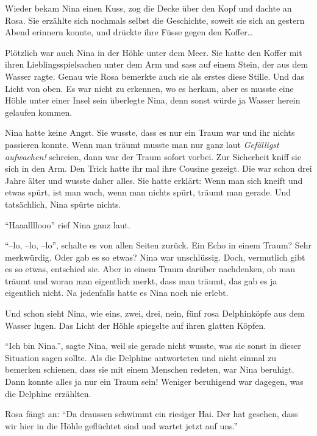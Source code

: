 Wieder bekam Nina einen Kuss, zog die Decke über den Kopf und dachte an Rosa. Sie erzählte sich nochmals selbst die Geschichte, soweit sie sich an gestern Abend erinnern konnte, und drückte ihre Füsse gegen den Koffer\dots

\vspace{10pt}
\centerline{\Huge \Dolphin[DeepPink]}
\vspace{10pt}

Plötzlich war auch Nina in der Höhle unter dem Meer. Sie hatte den Koffer mit ihren Lieblingsspielsachen unter dem Arm und sass auf einem Stein, der aus dem Wasser ragte. Genau wie Rosa bemerkte auch sie als erstes diese Stille. Und das Licht von oben. Es war nicht zu erkennen, wo es herkam, aber es musste eine Höhle unter einer Insel sein überlegte Nina, denn sonst würde ja Wasser herein gelaufen kommen.

Nina hatte keine Angst. Sie wusste, dass es nur ein Traum war und ihr nichts passieren konnte. Wenn man träumt musste man nur ganz laut {\itshape Gefälligst aufwachen!} schreien, dann war der Traum sofort vorbei. Zur Sicherheit kniff sie sich in den Arm. Den Trick hatte ihr mal ihre Cousine gezeigt. Die war schon drei Jahre älter und wusste daher alles. Sie hatte erklärt: Wenn man sich kneift und etwas spürt, ist man wach, wenn man nichts spürt, träumt man gerade. Und tatsächlich, Nina spürte nichts.

\enquote{Haaallllooo} rief Nina ganz laut.

\enquote{--lo, --lo, --lo}, schalte es von allen Seiten zurück. Ein Echo in einem Traum? Sehr merkwürdig. Oder gab es so etwas? Nina war unschlüssig. Doch, vermutlich gibt es so etwas, entschied sie. Aber in einem Traum darüber nachdenken, ob man träumt und woran man eigentlich merkt, dass man träumt, das gab es ja eigentlich nicht. Na jedenfalls hatte es Nina noch nie erlebt.

Und schon sieht Nina, wie eins, zwei, drei, nein, fünf rosa Delphinköpfe aus dem Wasser lugen. Das Licht der Höhle spiegelte auf ihren glatten Köpfen. 

\enquote{Ich bin Nina.}, sagte Nina, weil sie gerade nicht wusste, was sie sonst in dieser Situation sagen sollte. Als die Delphine antworteten und nicht einmal zu bemerken schienen, dass sie mit einem Menschen redeten, war Nina beruhigt. Dann konnte alles ja nur ein Traum sein! Weniger beruhigend war dagegen, was die Delphine erzählten.

Rosa fängt an: \enquote{Da draussen schwimmt ein riesiger Hai. Der hat gesehen, dass wir hier in die Höhle geflüchtet sind und wartet jetzt auf uns.}

